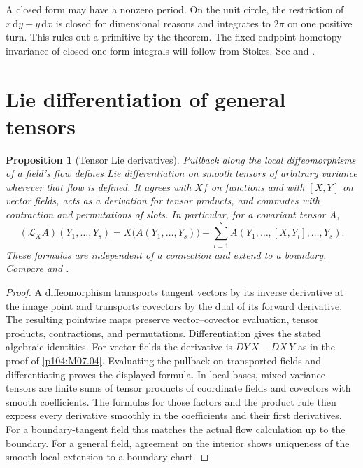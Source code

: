 \documentclass[11pt,oneside,openany]{book}
\newtheorem{proposition}[theorem]{Proposition}
\theoremstyle{definition}
\theoremstyle{remark}
\newcommand{\dd}{\mathrm d}
\begin{document}
A closed form may have a nonzero period. On the unit circle, the restriction of \(x\,\dd y-y\,\dd x\) is closed for dimensional reasons and integrates to \(2\pi\) on one positive turn. This rules out a primitive by the theorem. The fixed-endpoint homotopy invariance of closed one-form integrals will follow from Stokes. See \cite[Chapter 11, pp.~287--298]{lee} and \cite[Sections 18.7 and 19.7]{tu}.

\section{Lie differentiation of general tensors}

\begin{proposition}[Tensor Lie derivatives]
\label{p104:M07.06}
Pullback along the local diffeomorphisms of a field's flow defines Lie differentiation on smooth tensors of arbitrary variance wherever that flow is defined. It agrees with \(Xf\) on functions and with \([X,Y]\) on vector fields, acts as a derivation for tensor products, and commutes with contraction and permutations of slots. In particular, for a covariant tensor \(A\),
\[
 (\mathcal L_X A)(Y_1,\ldots,Y_s)
 =X\big(A(Y_1,\ldots,Y_s)\big)
  -\sum_{i=1}^s A(Y_1,\ldots,[X,Y_i],\ldots,Y_s).
\]
These formulas are independent of a connection and extend to a boundary. Compare \cite[Chs.~9 and 12]{lee} and \cite[\S20]{tu}.
\end{proposition}

\begin{proof}
A diffeomorphism transports tangent vectors by its inverse derivative at the image point and transports covectors by the dual of its forward derivative. The resulting pointwise maps preserve vector--covector evaluation, tensor products, contractions, and permutations. Differentiation gives the stated algebraic identities. For vector fields the derivative is \(DY\,X-DX\,Y\) as in the proof of \cref{p104:M07.04}. Evaluating the pullback on transported fields and differentiating proves the displayed formula. In local bases, mixed-variance tensors are finite sums of tensor products of coordinate fields and covectors with smooth coefficients. The formulas for those factors and the product rule then express every derivative smoothly in the coefficients and their first derivatives. For a boundary-tangent field this matches the actual flow calculation up to the boundary. For a general field, agreement on the interior shows uniqueness of the smooth local extension to a boundary chart.
\end{proof}
\end{document}
